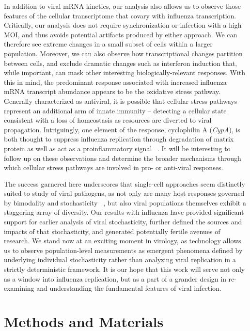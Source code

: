 \documentclass[9pt,lineno]{elife}
\begin{document}
In addition to viral mRNA kinetics, our analysis also allows us to observe those features of the cellular transcriptome that covary with influenza transcription.
Critically, our analysis does not require synchronization or infection with a high MOI, and thus avoids potential artifacts produced by either approach. 
We can therefore see extreme changes in a small subset of cells within a larger population.
Moreover, we can also observe how transcriptional changes partition between cells, and exclude dramatic changes such as interferon induction that, while important, can mask other interesting biologically-relevant responses. 
With this in mind, the predominant response associated with increased influenza mRNA transcript abundance appears to be the oxidative stress pathway. 
Generally characterized as antiviral, it is possible that cellular stress pathways represent an additional arm of innate immunity -- detecting a cellular state consistent with a loss of homeostasis as resources are diverted to viral propagation. 
Intriguingly, one element of the response, cyclophilin A (\emph{CypA}), is both thought to suppress influenza replication through degradation of matrix protein as well as act as a proinflammatory signal ~\citep{Liu:2009er, Jin:2004ii}.
It will be interesting to follow up on these observations and determine the broader mechanisms through which cellular stress pathways are involved in pro- or anti-viral responses.

The success garnered here underscores that single-cell approaches seem distinctly suited to study of viral pathogens, as not only are many host responses governed by bimodality and stochasticity ~\citep{Shalek:2014ey,Shalek:2013ej}, but also viral populations themselves exhibit a staggering array of diversity.
Our results with influenza have provided significant support for earlier analysis of viral stochasticity, further defined the sources and impacts of that stochasticity, and generated potentially fertile avenues of research. 
We stand now at an exciting moment in virology, as technology allows us to observe population-level measurements as emergent phenomena defined by underlying individual stochasticity rather than analyzing viral replication in a strictly deterministic framework.
It is our hope that this work will serve not only as a window into influenza replication, but as a part of a grander design in re-examining and understanding the fundamental features of viral infection.


\section{Methods and Materials}
\end{document}
